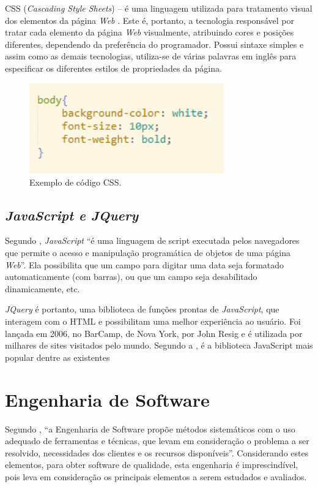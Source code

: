 \documentclass[
	12pt,				%
    oneside,			%
	a4paper,			%
	english,			%
	french,				%
	spanish,			%
	brazil,				%
	]{abntex2}
\begin{document}
CSS (\textit{Cascading Style Sheets}) – é uma linguagem utilizada para tratamento
visual dos elementos da página \textit{Web} \cite{folle}. Este é, portanto, a tecnologia
responsável por tratar cada elemento da página \textit{Web} visualmente, atribuindo cores e
posições diferentes, dependendo da preferência do programador. Possui sintaxe
simples e assim como as demais tecnologias, utiliza-se de várias palavras em inglês
para especificar os diferentes estilos de propriedades da página.

\begin{figure} [hbt] 
\begin{center}
\includegraphics[width=0.75\textwidth]{excss.png}
\end{center}
\label{figura1} 
\caption{Exemplo de código CSS.}
\end{figure}

\subsection{\textit{JavaScript e JQuery}}

Segundo , \textit{JavaScript} “é uma linguagem de script executada pelos
navegadores que permite o acesso e manipulação programática de objetos de uma
página \textit{Web}”. Ela possibilita que um campo para digitar uma data seja formatado
automaticamente (com barras), ou que um campo seja desabilitado dinamicamente,
etc. 

\textit{JQuery} é portanto, uma biblioteca de funções prontas de \textit{JavaScript}, que
interagem com o HTML e possibilitam uma melhor experiência ao usuário. Foi lançada
em 2006, no BarCamp, de Nova York, por John Resig e é utilizada por milhares de
sites visitados pelo mundo. Segundo a , é a biblioteca JavaScript
mais popular dentre as existentes

\section{Engenharia de Software}
Segundo , “a Engenharia de Software propõe métodos
sistemáticos com o uso adequado de ferramentas e técnicas, que levam em
consideração o problema a ser resolvido, necessidades dos clientes e os recursos
disponíveis”. Considerando estes elementos, para obter software de qualidade, esta
engenharia é imprescindível, pois leva em consideração os principais elementos a
serem estudados e avaliados.
\end{document}
